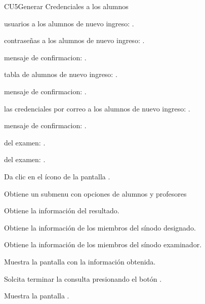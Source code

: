 \begin{UseCase}{CU5}{Generar Credenciales a los alumnos}
{\begin{UClist}
			\UCli {} usuarios a los alumnos de nuevo ingreso: \ioObtener.

			\UCli {} contraseñas a los alumnos de nuevo ingreso: \ioObtener.
			
			\UCli {} mensaje de confirmacion: \ioObtener.

			\UCli {} tabla de alumnos de nuevo ingreso: \ioObtener.

			\UCli {} mensaje de confirmacion: \ioObtener.

			\UCli {} las credenciales por correo a los alumnos de nuevo ingreso: \ioObtener.

			\UCli {} mensaje de confirmacion: \ioObtener.
			
			\UCli {} del examen: \ioObtener.
			
			\UCli {} del examen: \ioObtener. 
			
			
			
			
			
									
		\end{UClist}
	}

\end{UseCase}

\begin{UCtrayectoria}
	
	\UCpaso[\UCactor] Da clic en el ícono \btnVer de la pantalla .
	
	\UCpaso[\UCsist] Obtiene un submenu con opciones de alumnos y profesores
	
	\UCpaso[\UCsist] Obtiene la información del resultado.
	
	\UCpaso[\UCsist] Obtiene la información de los miembros del sínodo designado.
	
	\UCpaso[\UCsist] Obtiene la información de los miembros del sínodo examinador.
	
	\UCpaso[\UCsist] Muestra la pantalla  con la información obtenida.
	
	\UCpaso[\UCactor] Solcita terminar la consulta presionando el botón .  \label{CUTI5.1-8:terminaConsulta}
	
	\UCpaso[\UCsist] Muestra la pantalla .
	
\end{UCtrayectoria}


